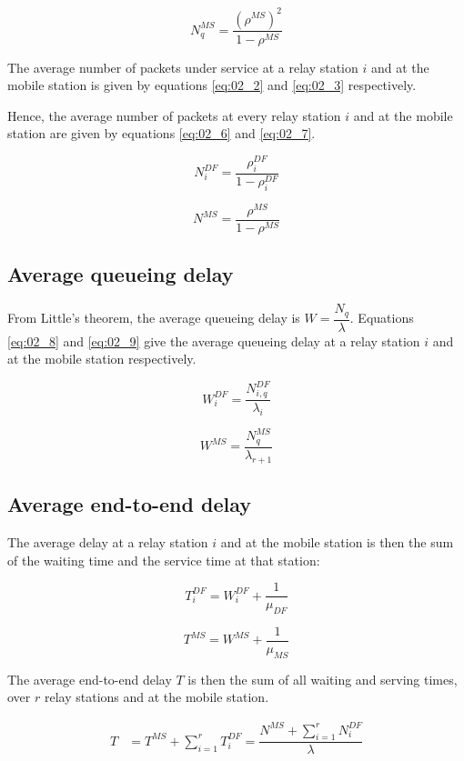 \begin{equation}
  N_q^{MS} = \dfrac{(\rho^{MS})^2}{1 - \rho^{MS}}
  \label{eq:02_5}
\end{equation}

The average number of packets under service at a relay station $i$ and at the
mobile station is given by equations \ref{eq:02_2} and \ref{eq:02_3} respectively.

Hence, the average number of packets at every relay station $i$ and at the
mobile station are given by equations \ref{eq:02_6} and \ref{eq:02_7}.

\begin{equation}
  N_i^{DF} = \dfrac{\rho_i^{DF}}{1 - \rho_i^{DF}}
  \label{eq:02_6}
\end{equation}

\begin{equation}
  N^{MS} =  \dfrac{\rho^{MS}}{1 - \rho^{MS}}
  \label{eq:02_7}
\end{equation}


\subsection{Average queueing delay}

From Little's theorem, the average queueing delay is $W = \dfrac{N_q}{\lambda}$.
Equations \ref{eq:02_8} and \ref{eq:02_9} give the average queueing delay at a
relay station $i$ and at the mobile station respectively.

\begin{equation}
  W_i^{DF} = \dfrac{N_{i,q}^{DF}}{\lambda_i}
  \label{eq:02_8}
\end{equation}

\begin{equation}
  W^{MS} = \dfrac{N_q^{MS}}{\lambda_{r+1}}
  \label{eq:02_9}
\end{equation}


\subsection{Average end-to-end delay}

The average delay at a relay station $i$ and at the mobile station is then the
sum of the waiting time and the service time at that station:

\begin{equation}
  T_i^{DF} = W_i^{DF} + \dfrac{1}{\mu_{DF}}
  \label{eq:02_10}
\end{equation}

\begin{equation}
  T^{MS} = W^{MS} + \dfrac{1}{\mu_{MS}}
  \label{eq:02_11}
\end{equation}


The average end-to-end delay $T$ is then the sum of all waiting and serving times,
over $r$ relay stations and at the mobile station.

\begin{align*}
  T &= T^{MS} + \sum\limits_{i=1}^r T_i^{DF}= \dfrac{N^{MS} + \sum\limits_{i=1}^r N_i^{DF}}{\lambda}
\end{align*}
